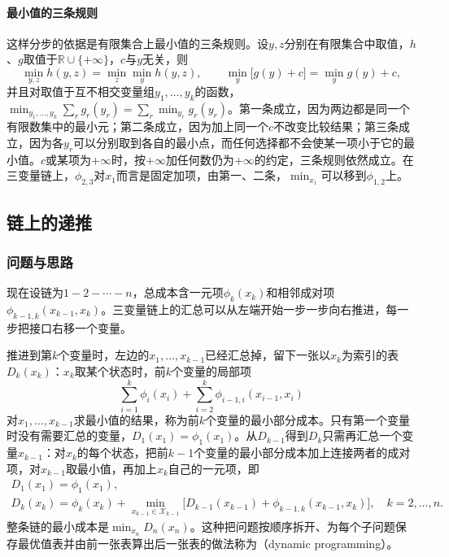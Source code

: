 \paragraph{最小值的三条规则}
这样分步的依据是有限集合上最小值的三条规则。设$y,z$分别在有限集合中取值，$h$、$g$取值于$\mathbb R\cup\{+\infty\}$，$c$与$y$无关，则
\begin{equation}
\min_{y,z}h(y,z)=\min_{z}\min_{y}h(y,z),\qquad
\min_{y}\bigl[g(y)+c\bigr]=\min_{y}g(y)+c,
\label{eq:graph-dp-min-rules}
\end{equation}
并且对取值于互不相交变量组$y_1,\ldots,y_k$的函数，$\min_{y_1,\ldots,y_k}\sum_{r}g_r(y_r)=\sum_r\min_{y_r}g_r(y_r)$。第一条成立，因为两边都是同一个有限数集中的最小元；第二条成立，因为加上同一个$c$不改变比较结果；第三条成立，因为各$y_r$可以分别取到各自的最小点，而任何选择都不会使某一项小于它的最小值。$c$或某项为$+\infty$时，按$+\infty$加任何数仍为$+\infty$的约定，三条规则依然成立。在三变量链上，$\phi_{2,3}$对$x_1$而言是固定加项，由第一、二条，$\min_{x_1}$可以移到$\phi_{1,2}$上。

\subsection{链上的递推}
\label{sec:graph-dp-chain}

\subsubsection{问题与思路}

现在设链为$1-2-\cdots-n$，总成本含一元项$\phi_k(x_k)$和相邻成对项$\phi_{k-1,k}(x_{k-1},x_k)$。三变量链上的汇总可以从左端开始一步一步向右推进，每一步把接口右移一个变量。

推进到第$k$个变量时，左边的$x_1,\ldots,x_{k-1}$已经汇总掉，留下一张以$x_k$为索引的表$D_k(x_k)$：$x_k$取某个状态时，前$k$个变量的局部项
\[
\sum_{i=1}^{k}\phi_i(x_i)+\sum_{i=2}^{k}\phi_{i-1,i}(x_{i-1},x_i)
\]
对$x_1,\ldots,x_{k-1}$求最小值的结果，称为前$k$个变量的最小部分成本。只有第一个变量时没有需要汇总的变量，$D_1(x_1)=\phi_1(x_1)$。从$D_{k-1}$得到$D_k$只需再汇总一个变量$x_{k-1}$：对$x_k$的每个状态，把前$k-1$个变量的最小部分成本加上连接两者的成对项，对$x_{k-1}$取最小值，再加上$x_k$自己的一元项，即
\begin{equation}
\begin{gathered}
D_1(x_1)=\phi_1(x_1),\\
D_k(x_k)=\phi_k(x_k)+\min_{x_{k-1}\in\mathcal X_{k-1}}\bigl[D_{k-1}(x_{k-1})+\phi_{k-1,k}(x_{k-1},x_k)\bigr],\quad k=2,\ldots,n.
\end{gathered}
\label{eq:graph-dp-chain-recursion}
\end{equation}
整条链的最小成本是$\min_{x_n}D_n(x_n)$。这种把问题按顺序拆开、为每个子问题保存最优值表并由前一张表算出后一张表的做法称为（dynamic programming）。

